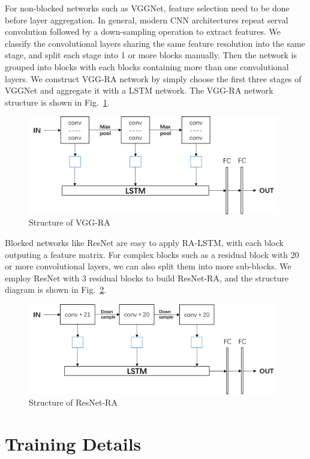 \documentclass[runningheads]{llncs}
\begin{document}
For non-blocked networks such as VGGNet, feature selection need to be done before layer aggregation. In general, modern CNN architectures repeat serval convolution followed by a down-sampling operation to extract features. We classify the convolutional layers sharing the same feature resolution into the same stage, and split each stage into 1 or more blocks manually. Then the network is grouped into blocks with each blocks containing more than one convolutional layers. We construct VGG-RA network by simply choose the first three stages of VGGNet and aggregate it with a LSTM network. The VGG-RA network structure is shown in Fig.~\ref{fig:VGG-RA}.
\begin{figure}  
	\centering
	\includegraphics[width=11cm]{Figures/VGG-RA.png}
	\caption{Structure of VGG-RA}
	\label{fig:VGG-RA}
\end{figure}

Blocked networks like ResNet are easy to apply RA-LSTM, with each block outputing a feature matrix. For complex blocks such as a residual block with 20 or more convolutional layers, we can also split them into more sub-blocks. We employ ResNet with 3 residual blocks to build ResNet-RA, and the structure diagram is shown in Fig.~\ref{fig:ResNet-RA}.
\begin{figure}  
	\centering
	\includegraphics[width=11cm]{Figures/ResNet-RA.png}
	\caption{Structure of ResNet-RA}
	\label{fig:ResNet-RA}
\end{figure}

\section{Training Details}
\end{document}
